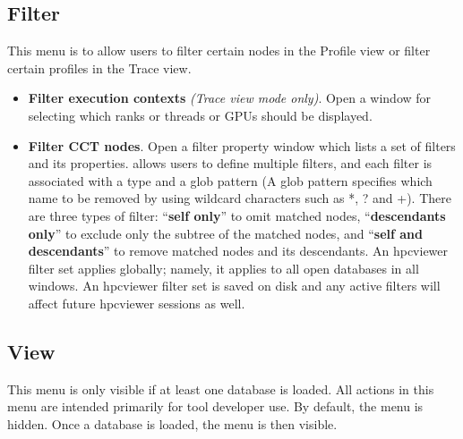 \documentclass[english]{article}
\begin{document}

\subsection{Filter}
This menu is to allow users to filter certain nodes in the Profile view or filter certain profiles in the Trace view.
\begin{itemize}

 \item \textbf{Filter execution contexts} \emph{(Trace view mode only)}.
  Open a window for selecting which ranks or threads or GPUs should be displayed.

 \item \textbf{Filter CCT nodes}.
  Open a filter property window which lists a set of filters and its properties.
 allows  users to define multiple filters, and each filter is associated with a type and a glob pattern (A glob pattern specifies which name to be removed by using wildcard characters such as *, ? and +).
There are three types of filter: ``\textbf{self only}'' to omit matched nodes,
``\textbf{descendants only}'' to exclude only the subtree of the matched nodes, and ``\textbf{self and descendants}'' to
remove matched nodes and its descendants.
An hpcviewer filter set applies globally; namely, it applies to all open databases in all windows. An hpcviewer filter set is saved on disk and any active filters will affect future hpcviewer sessions as well.


\end{itemize}


\subsection{View}
This menu is only visible if at least one database is loaded.
All actions in this menu are intended primarily for tool developer use.
By default, the menu is hidden. Once a database is loaded, the menu is then visible.
\end{document}
